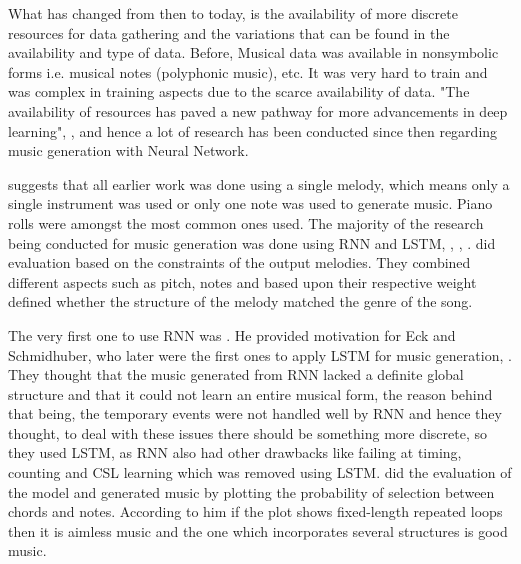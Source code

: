 \documentclass[oneside,12pt]{Classes/RoboticsLaTeX}
\begin{document}
What has changed from then to today, is the availability of more discrete resources for data gathering and the variations that can be found in the availability and type of data. Before, Musical data was available in nonsymbolic forms i.e. musical notes (polyphonic music), etc. It was very hard to train and was complex in training aspects due to the scarce availability of data. "The availability of resources has paved a new pathway for more advancements in deep learning", \cite{deeplearning}, and hence a lot of research has been conducted since then regarding music generation with Neural Network.

\cite{jpon} suggests that all earlier work was done using a single melody, which means only a single instrument was used or only one note was used to generate music. Piano rolls were amongst the most common ones used. The majority  of the research being conducted for music generation was done using RNN and LSTM,  \cite{lstmtemporal}, \cite{rnnmelodies}, \cite{eck}. \cite{rnnmelodies} did evaluation based on the constraints of the output melodies. They combined different aspects such as pitch, notes and based upon their respective weight defined whether the structure of the melody matched the genre of the song.

The very first one to use RNN was \cite{mozer}. He provided motivation for Eck and Schmidhuber, who later were the first ones to apply LSTM for music generation, \cite{eckschmid}. They thought that the music generated from RNN lacked a definite global structure and that it could not learn an entire musical form, the reason behind that being, the temporary events were not handled well by RNN and hence they thought, to deal with these issues there should be something more discrete, so they used LSTM, as RNN also had other drawbacks like failing at timing, counting and CSL learning which was removed using LSTM. \cite{eck} did the evaluation of the model and generated music by plotting the probability of selection between chords and notes. According to him if the plot shows fixed-length repeated loops then it is aimless music and the one which incorporates several structures is good music.
\end{document}
